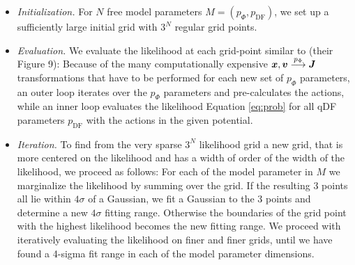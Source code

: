 \begin{itemize}

\item \emph{Initialization.} For $N$ free model parameters $M=(p_\Phi,p_\text{DF})$, we set up a sufficiently large initial grid with $3^N$ regular grid points.

\item  \emph{Evaluation.} We evaluate the likelihood at each grid-point similar to \citet{2013ApJ...779..115B} (their Figure 9): Because of the many computationally expensive $\boldsymbol{x},\boldsymbol{v} \overset{p_\Phi}{\longrightarrow} \boldsymbol{J}$ transformations that have to be performed for each new set of $p_\Phi$ parameters, an outer loop iterates over the $p_\Phi$ parameters and pre-calculates the actions, while an inner loop evaluates the likelihood Equation \ref{eq:prob} for all qDF parameters $p_\text{DF}$ with the actions in the given potential.

\item \emph{Iteration.} To find from the very sparse $3^N$ likelihood grid a new grid, that is more centered on the likelihood and has a width of order of the width of the likelihood, we proceed as follows: For each of the model parameter in $M$ we marginalize the likelihood by summing over the grid. If the resulting 3 points all lie within $4\sigma$ of a Gaussian, we fit a Gaussian to the 3 points and determine a new $4\sigma$ fitting range. Otherwise the boundaries of the grid point with the highest likelihood becomes the new fitting range. We proceed with iteratively evaluating the likelihood on finer and finer grids, until we have found a 4-sigma fit range in each of the model parameter dimensions.


\end{itemize}

